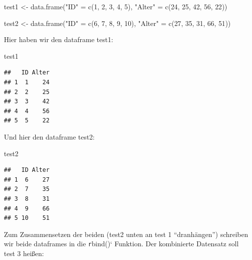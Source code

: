 \documentclass[
]{book}
\newenvironment{Shaded}{\begin{snugshade}}{\end{snugshade}}
\newcommand{\DecValTok}[1]{\textcolor[rgb]{0.00,0.00,0.81}{#1}}
\newcommand{\FunctionTok}[1]{\textcolor[rgb]{0.00,0.00,0.00}{#1}}
\newcommand{\NormalTok}[1]{#1}
\newcommand{\OtherTok}[1]{\textcolor[rgb]{0.56,0.35,0.01}{#1}}
\newcommand{\StringTok}[1]{\textcolor[rgb]{0.31,0.60,0.02}{#1}}
\begin{document}
\begin{Shaded}
\begin{Highlighting}[]
\NormalTok{test1 }\OtherTok{\textless{}{-}} \FunctionTok{data.frame}\NormalTok{(}\StringTok{"ID"} \OtherTok{=} \FunctionTok{c}\NormalTok{(}\DecValTok{1}\NormalTok{, }\DecValTok{2}\NormalTok{, }\DecValTok{3}\NormalTok{, }\DecValTok{4}\NormalTok{, }\DecValTok{5}\NormalTok{),}
                     \StringTok{"Alter"} \OtherTok{=} \FunctionTok{c}\NormalTok{(}\DecValTok{24}\NormalTok{, }\DecValTok{25}\NormalTok{, }\DecValTok{42}\NormalTok{, }\DecValTok{56}\NormalTok{, }\DecValTok{22}\NormalTok{))}

\NormalTok{test2 }\OtherTok{\textless{}{-}} \FunctionTok{data.frame}\NormalTok{(}\StringTok{"ID"} \OtherTok{=} \FunctionTok{c}\NormalTok{(}\DecValTok{6}\NormalTok{, }\DecValTok{7}\NormalTok{, }\DecValTok{8}\NormalTok{, }\DecValTok{9}\NormalTok{, }\DecValTok{10}\NormalTok{),}
                     \StringTok{"Alter"} \OtherTok{=} \FunctionTok{c}\NormalTok{(}\DecValTok{27}\NormalTok{, }\DecValTok{35}\NormalTok{, }\DecValTok{31}\NormalTok{, }\DecValTok{66}\NormalTok{, }\DecValTok{51}\NormalTok{))}
\end{Highlighting}
\end{Shaded}

Hier haben wir den dataframe test1:

\begin{Shaded}
\begin{Highlighting}[]
\NormalTok{test1}
\end{Highlighting}
\end{Shaded}

\begin{verbatim}
##   ID Alter
## 1  1    24
## 2  2    25
## 3  3    42
## 4  4    56
## 5  5    22
\end{verbatim}

Und hier den dataframe test2:

\begin{Shaded}
\begin{Highlighting}[]
\NormalTok{test2}
\end{Highlighting}
\end{Shaded}

\begin{verbatim}
##   ID Alter
## 1  6    27
## 2  7    35
## 3  8    31
## 4  9    66
## 5 10    51
\end{verbatim}

Zum Zusammensetzen der beiden (test2 unten an test 1 ``dranhängen'') schreiben wir beide dataframes in die \texttt{r}bind()` Funktion. Der kombinierte Datensatz soll test 3 heißen:
\end{document}
